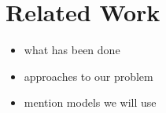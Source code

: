\chapter{Related Work}

\begin{itemize}
    \item what has been done
    \item approaches to our problem
    \item mention models we will use
\end{itemize}
